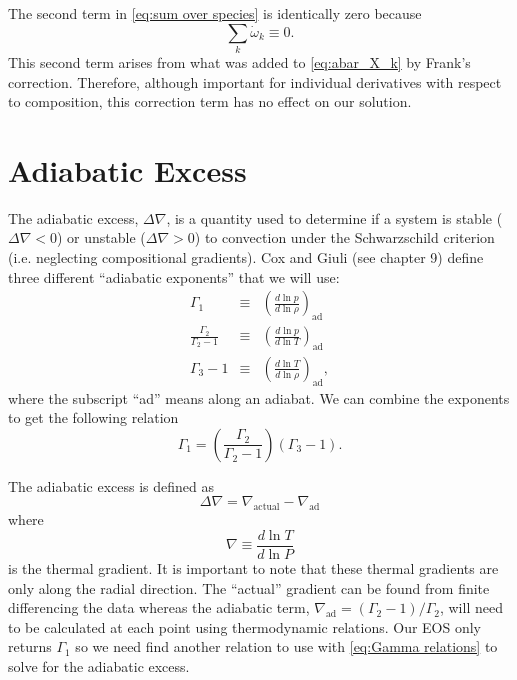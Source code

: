 The second term in \eqref{eq:sum over species} is identically zero because
\[
\sum_k \dot{\omega}_k \equiv 0.
\]
This second term arises from what was added to \eqref{eq:abar_X_k} by 
Frank's correction.  Therefore, although important for individual derivatives
with respect to composition, this correction term has no effect on our 
solution.

\section{Adiabatic Excess}
\label{Sec:Adiabatic Excess}
The adiabatic excess, $\Delta\nabla$, is a quantity used to determine
if a system is stable ($\Delta\nabla < 0$) or unstable ($\Delta\nabla
> 0$) to convection under the Schwarzschild criterion (i.e. neglecting
compositional gradients).  Cox and Giuli (see chapter 9) define three
different ``adiabatic exponents'' that we will use:
\begin{eqnarray*}
  \Gamma_1 &\equiv&   \left(\frac{d\ln p}{d\ln\rho}\right)_\text{ad} \\
  \frac{\Gamma_2}{\Gamma_2-1} &\equiv& 
  \left(\frac{d\ln p}{d\ln T}\right)_\text{ad} \\
  \Gamma_3 - 1 &\equiv& \left(\frac{d\ln T}{d\ln\rho}\right)_\text{ad},
\end{eqnarray*} 
where the subscript ``ad'' means along an adiabat.  We can combine the
exponents to get the following relation
\begin{equation}\label{eq:Gamma relations}
  \Gamma_1 = \left(\frac{\Gamma_2}{\Gamma_2-1}\right)\left(\Gamma_3-1\right).
\end{equation}

The adiabatic excess is defined as
\begin{equation}\label{eq:adiabatic excess}
  \Delta\nabla = \nabla_\text{actual} - \nabla_\text{ad}
\end{equation}
where
\begin{equation}\label{eq:thermal gradient}
  \nabla \equiv \frac{d\ln T}{d\ln P}
\end{equation}
is the thermal gradient.  It is important to note that these thermal
gradients are only along the radial direction.  The ``actual''
gradient can be found from finite differencing the data whereas the
adiabatic term, $\nabla_\text{ad} = \left(\Gamma_2-1\right) /
\Gamma_2$, will need to be calculated at each point using
thermodynamic relations.  Our EOS only returns $\Gamma_1$ so we need
find another relation to use with \eqref{eq:Gamma relations} to solve
for the adiabatic excess.  

